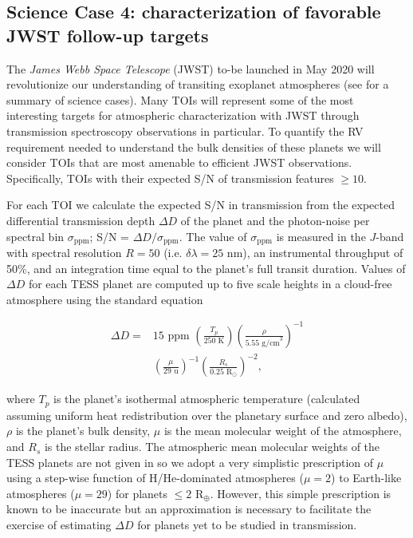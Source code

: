 \subsection{Science Case 4: characterization of favorable JWST follow-up targets} \label{sect:jwst}
The \emph{James Webb Space Telescope} (JWST) to-be launched in May 2020 will revolutionize our
understanding of transiting exoplanet atmospheres (see \citealt{beichman14} for a summary of science cases).
Many TOIs will represent some of the most interesting targets for atmospheric characterization with
JWST through transmission spectroscopy observations in particular. To quantify the RV requirement needed
to understand the bulk densities of these planets we will consider TOIs that are most amenable to
efficient JWST observations. Specifically, TOIs with their expected S/N of transmission features
$\geq 10$.

For each TOI we calculate the expected S/N in transmission from the expected
differential transmission depth $\Delta D$ of the planet and the photon-noise per spectral bin
$\sigma_{\text{ppm}}$; S/N = $\Delta D / \sigma_{\text{ppm}}$. The value of $\sigma_{\text{ppm}}$
is measured in the $J$-band with spectral resolution $R=50$ (i.e. $\delta \lambda = 25$ nm), an
instrumental throughput of 50\%, and an integration time equal to the planet's full transit duration.
Values of $\Delta D$ for each TESS planet are computed up to five
scale heights in a cloud-free atmosphere using the standard equation

\begin{equation}
  \begin{split}
    \Delta D = & 15 \text{ ppm } \left( \frac{T_p}{250 \text{ K}} \right)
    \left( \frac{\rho}{5.55 \text{ g/cm}^3} \right)^{-1} \\
    &\left( \frac{\mu}{29 \text{ u}} \right)^{-1}
    \left( \frac{R_s}{0.25 \text{ R}_{\odot}} \right)^{-2},
  \end{split}
  \label{eq:transm}
\end{equation}

\noindent where $T_p$ is the planet's isothermal atmospheric temperature (calculated assuming uniform heat
redistribution over the planetary surface and zero albedo), $\rho$ is the planet's
bulk density, $\mu$ is the mean molecular weight of the atmosphere, and $R_s$ is the stellar
radius. The atmospheric mean molecular weights of the TESS planets are not given in 
so we adopt a very simplistic prescription of $\mu$ using a step-wise function of H/He-dominated atmospheres
($\mu=2$) to Earth-like atmospheres ($\mu=29$) for planets $\leq 2$ R$_{\oplus}$. However, this simple prescription
is known to be inaccurate but an approximation is necessary to facilitate the exercise of estimating $\Delta D$
for planets yet to be studied in transmission.

